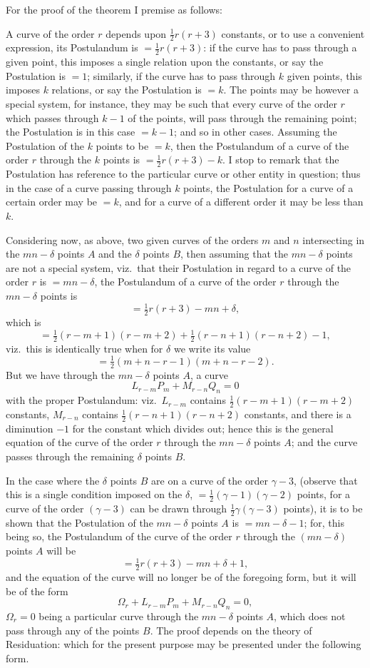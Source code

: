 \documentclass[11pt,a4paper]{book}
\begin{document}
For the proof of the theorem I premise as follows:

A curve of the order $r$ depends upon $\tfrac12 r(r+3)$ constants, or to use a convenient
expression, its Postulandum is $= \tfrac12 r(r+3)$: if the curve has to pass through a given
point, this imposes a single relation upon the constants, or say the Postulation is $= 1$;
similarly, if the curve has to pass through $k$ given points, this imposes $k$ relations,
or say the Postulation is $= k$. The points may be however a special system, for
instance, they may be such that every curve of the order $r$ which passes through
$k-1$ of the points, will pass through the remaining point; the Postulation is in this
case $= k-1$; and so in other cases. Assuming the Postulation of the $k$ points to
be $= k$, then the Postulandum of a curve of the order $r$ through the $k$ points is
$= \tfrac12 r(r+3) - k$. I stop to remark that the Postulation has reference to the particular
curve or other entity in question; thus in the case of a curve passing through
$k$ points, the Postulation for a curve of a certain order may be $= k$, and for a
curve of a different order it may be less than $k$.

Considering now, as above, two given curves of the orders $m$ and $n$ intersecting
in the $mn - \delta$ points $A$ and the $\delta$ points $B$, then assuming that the $mn - \delta$ points
are not a special system, viz.\ that their Postulation in regard to a curve of the
order $r$ is $= mn - \delta$, the Postulandum of a curve of the order $r$ through the $mn - \delta$
points is
\[
= \tfrac12 r(r+3) - mn + \delta,
\]
which is
\[
= \tfrac12(r-m+1)(r-m+2) + \tfrac12(r-n+1)(r-n+2) - 1,
\]
viz.\ this is identically true when for $\delta$ we write its value
\[
= \tfrac12(m+n-r-1)(m+n-r-2).
\]
But we have through the $mn - \delta$ points $A$, a curve
\[
L_{r-m} P_m + M_{r-n} Q_n = 0
\]
with the proper Postulandum: viz.\ $L_{r-m}$ contains $\tfrac12(r-m+1)(r-m+2)$ constants,
$M_{r-n}$ contains $\tfrac12(r-n+1)(r-n+2)$ constants, and there is a diminution $-1$ for the
constant which divides out; hence this is the general equation of the curve of the
order $r$ through the $mn - \delta$ points $A$; and the curve passes through the remaining
$\delta$ points $B$.

In the case where the $\delta$ points $B$ are on a curve of the order $\gamma-3$, (observe
that this is a single condition imposed on the $\delta$, $= \tfrac12(\gamma-1)(\gamma-2)$ points, for a curve
of the order $(\gamma-3)$ can be drawn through $\tfrac12\gamma(\gamma-3)$ points), it is to be shown that
the Postulation of the $mn - \delta$ points $A$ is $= mn - \delta - 1$; for, this being so, the
Postulandum of the curve of the order $r$ through the $(mn - \delta)$ points $A$ will be
\[
= \tfrac12 r(r+3) - mn + \delta + 1,
\]
and the equation of the curve will no longer be of the foregoing form, but it will
be of the form
\[
\Omega_r + L_{r-m} P_m + M_{r-n} Q_n = 0,
\]
$\Omega_r = 0$ being a particular curve through the $mn - \delta$ points $A$, which does not pass
through any of the points $B$. The proof depends on the theory of Residuation: which
for the present purpose may be presented under the following form.
\end{document}
